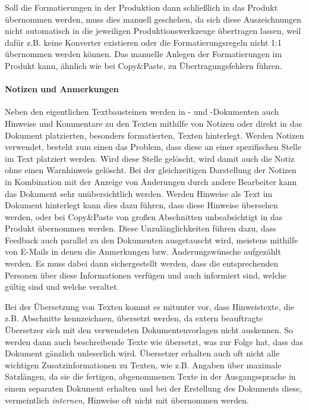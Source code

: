 Soll die Formatierungen in der Produktion dann schließlich in das Produkt übernommen werden, muss dies manuell geschehen, da sich diese Auszeichnungen nicht automatisch in die jeweiligen Produktionswerkzeuge übertragen lassen, weil dafür z.B. keine Konverter existieren oder die Formatierungsregeln nicht 1:1 übernommen werden können. Das manuelle Anlegen der Formatierungen im Produkt kann, ähnlich wie bei Copy\&Paste, zu Übertragungsfehlern führen.

\paragraph{Notizen und Anmerkungen} Neben den eigentlichen Textbausteinen werden in - und -Dokumenten auch Hinweise und Kommentare zu den Texten mithilfe von Notizen oder direkt in das Dokument platzierten, besonders formatierten, Texten hinterlegt. Werden Notizen verwendet, besteht zum einen das Problem, dass diese an einer spezifischen Stelle im Text platziert werden. Wird diese Stelle gelöscht, wird damit auch die Notiz ohne einen Warnhinweis gelöscht. Bei der gleichzeitigen Darstellung der Notizen in Kombination mit der Anzeige von Änderungen durch andere Bearbeiter kann das Dokument sehr unübersichtlich werden. Werden Hinweise als Text im Dokument hinterlegt kann dies dazu führen, dass diese Hinweise übersehen werden, oder bei Copy\&Paste von großen Abschnitten unbeabsichtigt in das Produkt übernommen  werden. Diese Unzulänglichkeiten führen dazu, dass Feedback auch parallel zu den Dokumenten ausgetauscht wird, meistens mithilfe von E-Mails in denen die Anmerkungen bzw. Änderungswünsche aufgezählt werden. Es muss dabei dann sichergestellt werden, dass die entsprechenden Personen über diese Informationen verfügen und auch informiert sind, welche gültig sind und welche veraltet.

Bei der Übersetzung von Texten kommt es mitunter vor, dass Hinweistexte, die z.B. Abschnitte kennzeichnen, übersetzt werden, da extern beauftragte Übersetzer sich mit den verwendeten Dokumentenvorlagen nicht auskennen. So werden dann auch beschreibende Texte wie  übersetzt, was zur Folge hat, dass das Dokument gänzlich unleserlich wird. Übersetzer erhalten auch oft nicht alle wichtigen Zusatzinformationen zu Texten, wie z.B. Angaben über maximale Satzlängen, da sie die fertigen, abgenommenen Texte in der Ausgangssprache in einem separaten Dokument erhalten und bei der Erstellung des Dokuments diese, vermeintlich \emph{internen}, Hinweise oft nicht mit übernommen werden.

